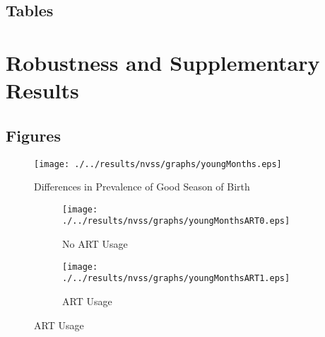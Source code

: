 \documentclass[a4paper, 12 pt]{article}
\theoremstyle{plain}
\begin{document}
\begin{spacing}{1.4}
\clearpage
\subsection{Tables}

\clearpage

\section{Robustness and Supplementary Results}
\subsection{Figures}
\begin{figure}[htpb!]
  \centering
  \caption{Differences in Prevalence of Good Season of Birth}
  \label{bqFig:YoungvOld}
  \centering
  \texttt{[image: ./../results/nvss/graphs/youngMonths.eps]}
\end{figure}


\begin{figure}[htpb!]
  \begin{center}
    \caption{Differences in Prevalence of Good Season of Birth by ART Usage}
    \label{fig:MonthART}
    \begin{subfigure}{.5\textwidth}
      \centering
      \texttt{[image: ./../results/nvss/graphs/youngMonthsART0.eps]}
      \caption{No ART Usage}
      \label{fig:MonthNoART}
    \end{subfigure}%
    \begin{subfigure}{.5\textwidth}
      \centering
      \texttt{[image: ./../results/nvss/graphs/youngMonthsART1.eps]}
      \caption{ART Usage}
      \label{fig:MonthYesART}
    \end{subfigure}
  \end{center}
\end{figure}


\end{spacing}
\end{document}
